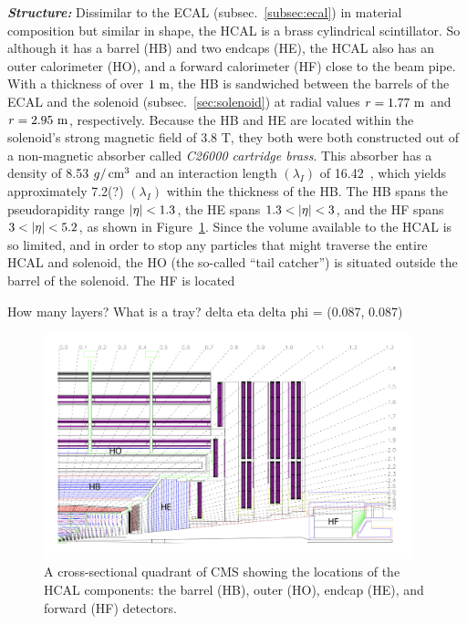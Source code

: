 \textit{\textbf{Structure:}}
Dissimilar to the ECAL (subsec.~\ref{subsec:ecal}) in material composition but similar in shape, the HCAL is a brass cylindrical scintillator.
So although it has a barrel (HB) and two endcaps (HE), the HCAL also has an outer calorimeter (HO), and a forward calorimeter (HF) close to the beam pipe.
With a thickness of over $1~\meter$, the HB is sandwiched between the barrels of the ECAL and the solenoid (subsec.~\ref{sec:solenoid}) at radial values $r = 1.77~\meter$ and $r = 2.95~\meter$, respectively.
Because the HB and HE are located within the solenoid's strong magnetic field of 3.8 T, they both were both constructed out of a non-magnetic absorber called \emph{C26000 cartridge brass}.
This absorber has a density of 8.53 $\g/\cm^{3}$ and an interaction length $(\lambda_I)$ of 16.42~\cm, which yields approximately 7.2(?) $(\lambda_I)$ within the thickness of the HB.
The HB spans the pseudorapidity range $\abseta < 1.3$, the HE spans $1.3 < \abseta < 3$, and the HF spans $3 < \abseta < 5.2$, as shown in Figure~\ref{fig:hcal_quadrant}.
Since the volume available to the HCAL is so limited, and in order to stop any particles that might traverse the entire HCAL and solenoid, the HO (the so-called ``tail catcher'') is situated outside the barrel of the solenoid.
The HF is located 

How many layers?
What is a tray?
delta eta delta phi = (0.087, 0.087)

\begin{figure}[pbth]
    \centering
    \includegraphics[width=0.95\textwidth]{figures/cms/hcal/hcal_quadrants_longitudinalview.jpg}
    \caption{
        A cross-sectional quadrant of CMS showing the locations of the HCAL components:
        the barrel (HB), outer (HO), endcap (HE), and forward (HF) detectors.
        }
    \label{fig:hcal_quadrant}
\end{figure}

